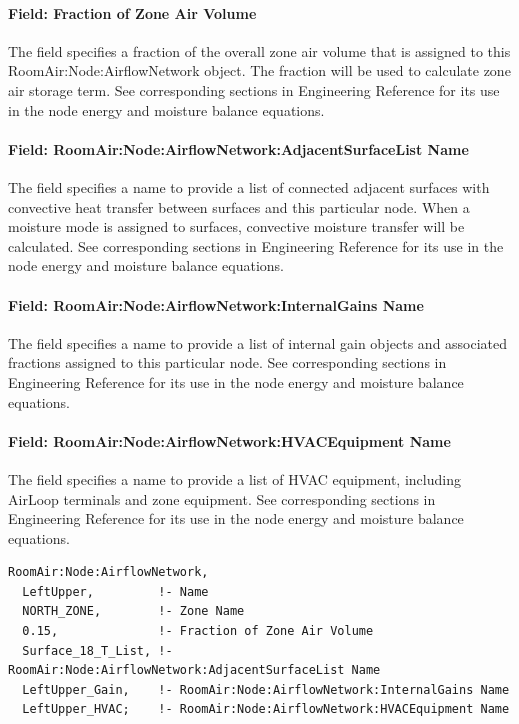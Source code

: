 \paragraph{Field: Fraction of Zone Air Volume}\label{field-fraction-of-zone-air-volume}

The field specifies a fraction of the overall zone air volume that is assigned to this RoomAir:Node:AirflowNetwork object. The fraction will be used to calculate zone air storage term. See corresponding sections in Engineering Reference for its use in the node energy and moisture balance equations.

\paragraph{Field: RoomAir:Node:AirflowNetwork:AdjacentSurfaceList Name}\label{field-roomairnodeairflownetworkadjacentsurfacelist-name}

The field specifies a name to provide a list of connected adjacent surfaces with convective heat transfer between surfaces and this particular node. When a moisture mode is assigned to surfaces, convective moisture transfer will be calculated. See corresponding sections in Engineering Reference for its use in the node energy and moisture balance equations.

\paragraph{Field: RoomAir:Node:AirflowNetwork:InternalGains Name}\label{field-roomairnodeairflownetworkinternalgains-name}

The field specifies a name to provide a list of internal gain objects and associated fractions assigned to this particular node. See corresponding sections in Engineering Reference for its use in the node energy and moisture balance equations.

\paragraph{Field: RoomAir:Node:AirflowNetwork:HVACEquipment Name}\label{field-roomairnodeairflownetworkhvacequipment-name}

The field specifies a name to provide a list of HVAC equipment, including AirLoop terminals and zone equipment. See corresponding sections in Engineering Reference for its use in the node energy and moisture balance equations.

\begin{lstlisting}
RoomAir:Node:AirflowNetwork,
  LeftUpper,         !- Name
  NORTH_ZONE,        !- Zone Name
  0.15,              !- Fraction of Zone Air Volume
  Surface_18_T_List, !- RoomAir:Node:AirflowNetwork:AdjacentSurfaceList Name
  LeftUpper_Gain,    !- RoomAir:Node:AirflowNetwork:InternalGains Name
  LeftUpper_HVAC;    !- RoomAir:Node:AirflowNetwork:HVACEquipment Name
\end{lstlisting}


